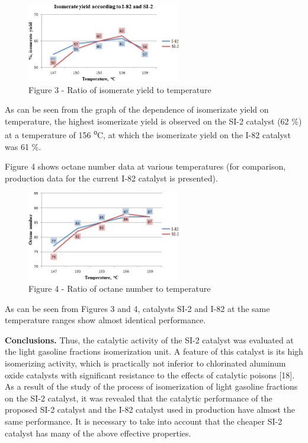 \begin{figure}[H]
	\centering
	\includegraphics[width=0.6\textwidth]{assets/1056}
	\caption*{Figure 3 - Ratio of isomerate yield to temperature}
\end{figure}

\begin{multicols}{2}
As can be seen from the graph of the dependence of isomerizate yield on
temperature, the highest isomerizate yield is observed on the SI-2
catalyst (62 \%) at a temperature of 156 \textsuperscript{о}C, at which
the isomerizate yield on the I-82 catalyst was 61 \%.

Figure 4 shows octane number data at various temperatures (for
comparison, production data for the current I-82 catalyst is presented).
\end{multicols}

\begin{figure}[H]
	\centering
	\includegraphics[width=0.6\textwidth]{assets/1057}
	\caption*{Figure 4 - Ratio of octane number to temperature}
\end{figure}

\begin{multicols}{2}
As can be seen from Figures 3 and 4, catalysts SI-2 and I-82 at the same
temperature ranges show almost identical performance.

{\bfseries Conclusions.} Thus, the catalytic activity of the SI-2 catalyst
was evaluated at the light gasoline fractions isomerization unit. A
feature of this catalyst is its high isomerizing activity, which is
practically not inferior to chlorinated aluminum oxide catalysts with
significant resistance to the effects of catalytic poisons {[}18{]}. As
a result of the study of the process of isomerization of light gasoline
fractions on the SI-2 catalyst, it was revealed that the catalytic
performance of the proposed SI-2 catalyst and the I-82 catalyst used in
production have almost the same performance. It is necessary to take
into account that the cheaper SI-2 catalyst has many of the above
effective properties.
\end{multicols}

